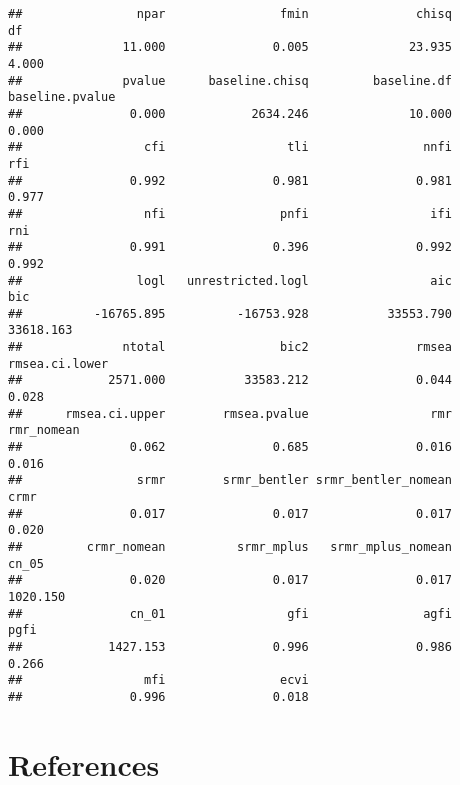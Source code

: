 \documentclass[
]{article}
\begin{document}
\begin{verbatim}
##                npar                fmin               chisq                  df 
##              11.000               0.005              23.935               4.000 
##              pvalue      baseline.chisq         baseline.df     baseline.pvalue 
##               0.000            2634.246              10.000               0.000 
##                 cfi                 tli                nnfi                 rfi 
##               0.992               0.981               0.981               0.977 
##                 nfi                pnfi                 ifi                 rni 
##               0.991               0.396               0.992               0.992 
##                logl   unrestricted.logl                 aic                 bic 
##          -16765.895          -16753.928           33553.790           33618.163 
##              ntotal                bic2               rmsea      rmsea.ci.lower 
##            2571.000           33583.212               0.044               0.028 
##      rmsea.ci.upper        rmsea.pvalue                 rmr          rmr_nomean 
##               0.062               0.685               0.016               0.016 
##                srmr        srmr_bentler srmr_bentler_nomean                crmr 
##               0.017               0.017               0.017               0.020 
##         crmr_nomean          srmr_mplus   srmr_mplus_nomean               cn_05 
##               0.020               0.017               0.017            1020.150 
##               cn_01                 gfi                agfi                pgfi 
##            1427.153               0.996               0.986               0.266 
##                 mfi                ecvi 
##               0.996               0.018
\end{verbatim}

\hypertarget{references}{%
\section{References}\label{references}}
\end{document}
